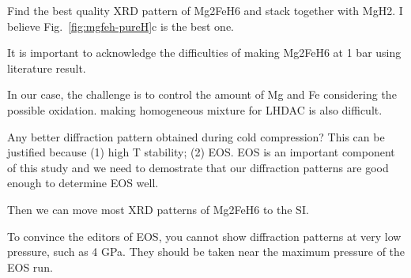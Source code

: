 \documentclass[draft,jgrga,12pt]{agujournal2019}
\begin{document}
\begin{cbox}
Find the best quality XRD pattern of Mg2FeH6 and stack together with MgH2.  I believe Fig.~\ref{fig:mgfeh-pureH}c is the best one.

It is important to acknowledge the difficulties of making Mg2FeH6 at 1 bar using literature result.  

In our case, the challenge is to control the amount of Mg and Fe considering the possible oxidation.  making homogeneous mixture for LHDAC is also difficult.\\


Any better diffraction pattern obtained during cold compression?  This can be justified because (1) high T stability; (2) EOS.
EOS is an important component of this study and we need to demostrate that our diffraction patterns are good enough to determine EOS well.\\

Then we can move most XRD patterns of Mg2FeH6 to the SI.
\end{cbox}


\begin{cboxr}
[DS] To convince the editors of EOS, you cannot show diffraction patterns at very low pressure, such as 4 GPa. They should be taken near the maximum pressure of the EOS run.\\
\end{cboxr}
\end{document}
